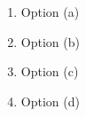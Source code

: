\begin{multicols}{2}
\begin{enumerate}
\item Option (a)
\item Option (b)
\item Option (c) 
\item Option (d)
\end{enumerate}
\end{multicols}
